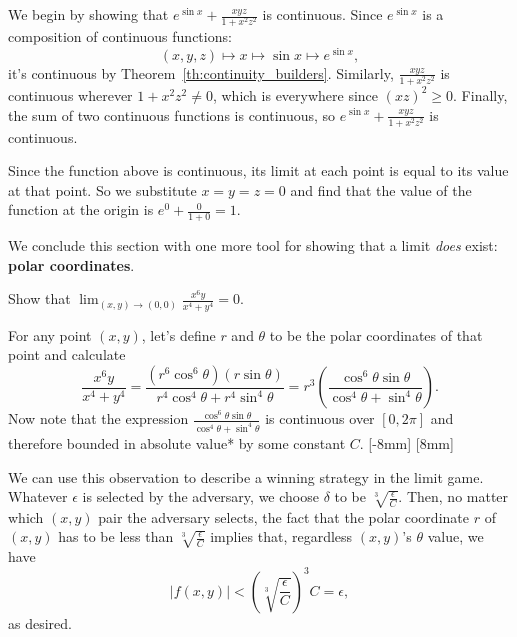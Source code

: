 \documentclass{watsonbook}
\begin{document}
\begin{solution}
  We begin by showing that $e^{\sin x} + \frac{xyz}{1 + x^2 z^2}$ is
    continuous.  Since $e^{\sin x}$ is a composition of continuous
    functions:
  \[
  (x,y,z) \mapsto x \mapsto \sin x \mapsto e^{\sin x}, 
  \]
  it's continuous by Theorem~\ref{th:continuity_builders}. Similarly,
  $\frac{xyz}{1 + x^2 z^2}$ is continuous wherever $1 + x^2 z^2 \neq
  0$, which is everywhere since $(xz)^2 \geq 0$. Finally, the sum of
  two continuous functions is continuous, so $e^{\sin x} +
  \frac{xyz}{1 + x^2 z^2}$ is continuous.

  Since the function above is continuous, its limit at each point is
  equal to its value at that point. So we substitute $x=y=z=0$ and
  find that the value of the function at the origin is
  $e^0 + \frac{0}{1+0} = 1$.
\end{solution}

We conclude this section with one more tool for showing that a limit
\textit{does} exist: \textbf{polar coordinates}.

\begin{example}{}{}
  Show that $\displaystyle{\lim_{(x,y) \to (0,0)}\frac{x^6 y}{x^4 + y^4} = 0}$. 
\end{example}

\begin{solution}
  For any point $(x,y)$, let's define $r$ and $\theta$ to be the polar
  coordinates of that point and calculate
  \[
    \frac{x^6 y}{x^4 + y^4} = \frac{(r^6 \cos^6 \theta) (r\sin \theta)}{r^4
      \cos^4 \theta + r^4\sin^4 \theta} = r^3 \left(\frac{\cos^6\theta \sin
      \theta}{ \cos^4 \theta + \sin^4\theta}\right). 
  \]
  Now note that the expression $\frac{\cos^6\theta \sin
      \theta}{ \cos^4 \theta + \sin^4\theta}$ is continuous over
    $[0,2\pi]$ and therefore bounded in absolute value* by some
    constant $C$. [-8mm]
    [8mm]

    We can use this observation to describe a winning strategy in the
    limit game. Whatever $\epsilon$ is selected by the adversary, we
    choose $\delta$ to be $\sqrt[3]{\frac{\epsilon}{C}}$. Then, 
    no matter which $(x,y)$ pair the adversary selects, the fact that
    the polar coordinate $r$ of $(x,y)$ has to be less than
    $\sqrt[3]{\frac{\epsilon}{C}}$ implies that, regardless $(x,y)$'s
    $\theta$ value, we have 
    \[
      |f(x,y)| <  \left(\sqrt[3]{\frac{\epsilon}{C}}\right)^3 C =
      \epsilon, 
    \]
    as desired. 
  \end{solution}
\end{document}
